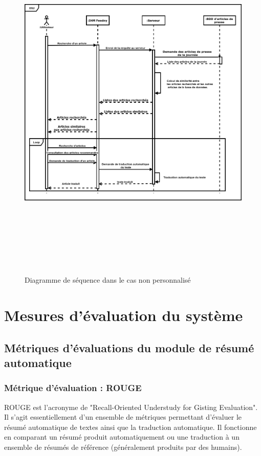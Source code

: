 \begin{figure}[H]
    \centering
    \includegraphics[height=500pt,width=425pt]{img/chapter3/diagseqnonperso.png}
    \caption{Diagramme de séquence dans le cas non personnalisé}
\end{figure}

\section{Mesures d'évaluation du système}
    \subsection{Métriques d'évaluations du module de résumé automatique}
        \subsubsection{Métrique d'évaluation : ROUGE\label{metrique-eval}}
        ROUGE est l'acronyme de "Recall-Oriented Understudy for Gisting Evaluation". Il s'agit essentiellement d'un ensemble de métriques permettant d'évaluer le résumé automatique de textes ainsi que la traduction automatique. Il fonctionne en comparant un résumé produit automatiquement ou une traduction à un ensemble de résumés de référence (généralement produits par des humains). \cite{rouge0}

